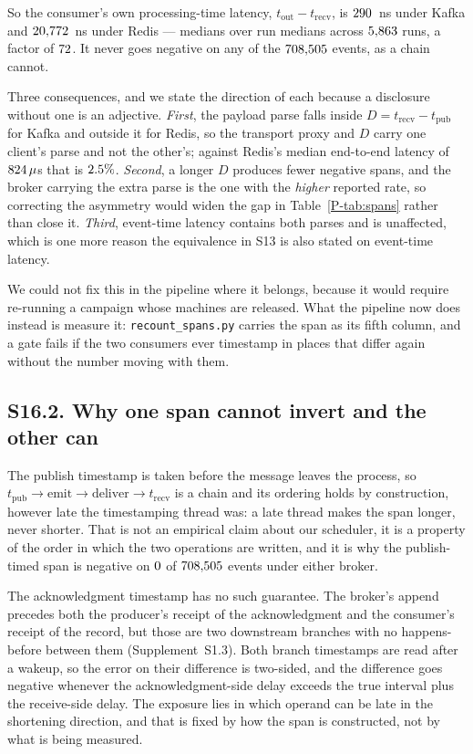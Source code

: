 \documentclass[10pt,journal,onecolumn]{IEEEtran}
\newcommand{\kafka}{Kafka}
\newcommand{\redis}{Redis}
\begin{document}
So the consumer's own processing-time latency, $t_{\mathrm{out}} - t_{\mathrm{recv}}$, is
$290$~ns under \kafka{} and $20{,}772$~ns under \redis{} ---
medians over run medians across $5{,}863$ runs, a factor of $72$. It never
goes negative on any of the $708{,}505$ events, as a chain cannot.

Three consequences, and we state the direction of each because a disclosure without one is
an adjective. \emph{First}, the payload parse falls inside $D = t_{\mathrm{recv}} -
t_{\mathrm{pub}}$ for \kafka{} and outside it for \redis{}, so the transport proxy and $D$
carry one client's parse and not the other's; against \redis{}'s median end-to-end latency of
$824\,\mu$s that is $2.5\%$. \emph{Second}, a longer
$D$ produces fewer negative spans, and the broker carrying the extra parse is the one with
the \emph{higher} reported rate, so correcting the asymmetry would widen the gap in
Table~\ref{P-tab:spans} rather than close it. \emph{Third}, event-time latency contains both parses and is unaffected,
which is one more reason the equivalence in S13 is also stated on event-time latency.

We could not fix this in the pipeline where it belongs, because it would require re-running
a campaign whose machines are released. What the pipeline now does instead is measure it:
\texttt{recount\_spans.py} carries the span as its fifth column, and a gate fails if the two
consumers ever timestamp in places that differ again without the number moving with them.

\subsection{S16.2. Why one span cannot invert and the other can}

The publish timestamp is taken before the message leaves the process, so
$t_{\mathrm{pub}} \rightarrow \text{emit} \rightarrow \text{deliver} \rightarrow
t_{\mathrm{recv}}$ is a chain and its ordering holds by construction, however late the
timestamping thread was: a late thread makes the span longer, never shorter. That is not an
empirical claim about our scheduler, it is a property of the order in which the two
operations are written, and it is why the publish-timed span is negative on
$0$ of $708{,}505$ events under either broker.

The acknowledgment timestamp has no such guarantee. The broker's append precedes both the
producer's receipt of the acknowledgment and the consumer's receipt of the record, but those
are two downstream branches with no happens-before between them (Supplement~S1.3). Both
branch timestamps are read after a wakeup, so the error on their difference is two-sided, and the
difference goes negative whenever the acknowledgment-side delay exceeds the true interval plus
the receive-side delay. The exposure lies in which operand can be late in the shortening
direction, and that is fixed by how the span is constructed, not by what is being measured.
\end{document}

